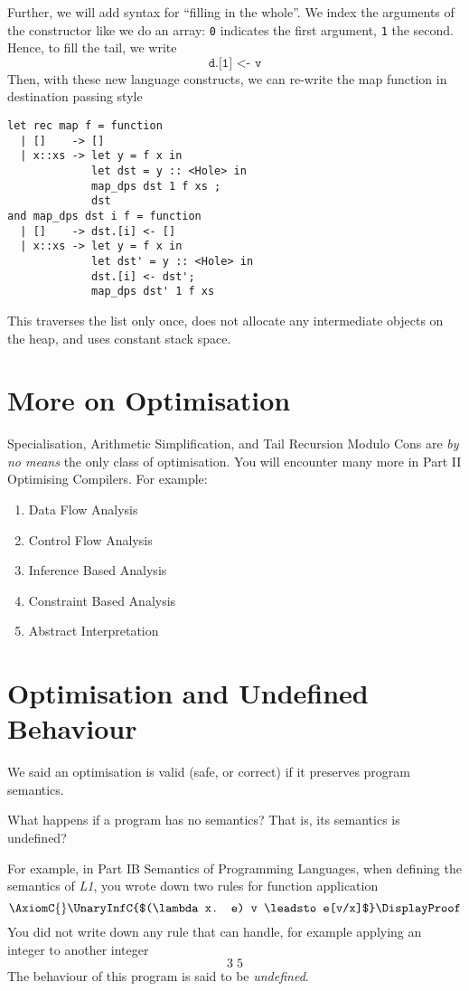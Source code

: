 Further, we will add syntax for ``filling in the whole''. We index the arguments of the constructor like we do an array: \texttt{0} indicates the first argument, \texttt{1} the second. Hence, to fill the tail, we write
\[\texttt{d.[1] <- v}\]
Then, with these new language constructs, we can re-write the map function in destination passing style
\begin{verbatim}
let rec map f = function
  | []    -> []
  | x::xs -> let y = f x in
             let dst = y :: <Hole> in
             map_dps dst 1 f xs ;
             dst
and map_dps dst i f = function
  | []    -> dst.[i] <- []
  | x::xs -> let y = f x in
             let dst' = y :: <Hole> in
             dst.[i] <- dst';
             map_dps dst' 1 f xs
\end{verbatim}
This traverses the list only once, does not allocate any intermediate objects on the heap, and uses constant stack space. 

\section{More on Optimisation}
Specialisation, Arithmetic Simplification, and Tail Recursion Modulo Cons are \textit{by no means} the only class of optimisation. You will encounter many more in \textsf{Part II Optimising Compilers}. For example:
\begin{enumerate}
    \item Data Flow Analysis
    \item Control Flow Analysis
    \item Inference Based Analysis
    \item Constraint Based Analysis
    \item Abstract Interpretation
\end{enumerate}

\section{Optimisation and Undefined Behaviour}
We said an optimisation is valid (safe, or correct) if it preserves program semantics. 

What happens if a program has no semantics? That is, its semantics is undefined?

For example, in \textsf{Part IB Semantics of Programming Languages}, when defining the semantics of \textit{L1}, you wrote down two rules for function application
\[
        \AxiomC{}
        \UnaryInfC{$(\lambda x. e) v \leadsto e[v/x]$}
        \DisplayProof
\]
You did not write down any rule that can handle, for example applying an integer to another integer
\[3 \; 5\]
The behaviour of this program is said to be \textit{undefined}.

